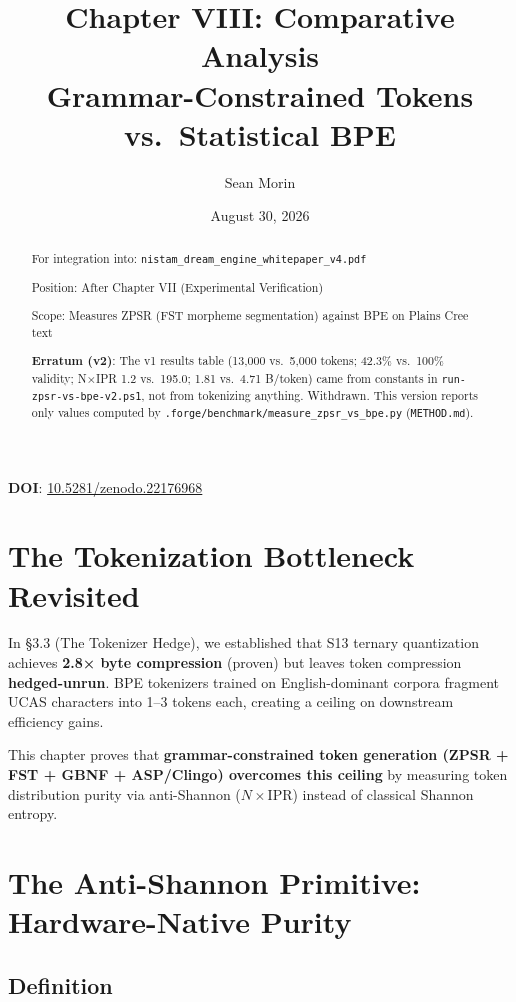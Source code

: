 \documentclass[11pt,oneside]{article}
\title{Chapter VIII: Comparative Analysis \\ \large Grammar-Constrained Tokens vs.\ Statistical BPE}
\author{Sean Morin}
\date{August 30, 2026}
\begin{document}
\maketitle

\begin{center}
\textbf{DOI}: \href{https://doi.org/10.5281/zenodo.22176968}{10.5281/zenodo.22176968}
\end{center}

\begin{abstract}
For integration into: \texttt{nistam\_dream\_engine\_whitepaper\_v4.pdf}

Position: After Chapter VII (Experimental Verification)

Scope: Measures ZPSR (FST morpheme segmentation) against BPE on Plains Cree text

\textbf{Erratum (v2)}: The v1 results table (13,000 vs.\ 5,000 tokens; 42.3\% vs.\ 100\% validity; N×IPR 1.2 vs.\ 195.0; 1.81 vs.\ 4.71 B/token) came from constants in \texttt{run-zpsr-vs-bpe-v2.ps1}, not from tokenizing anything. Withdrawn. This version reports only values computed by \texttt{.forge/benchmark/measure\_zpsr\_vs\_bpe.py} (\texttt{METHOD.md}).
\end{abstract}

\section{The Tokenization Bottleneck Revisited}

In \S 3.3 (The Tokenizer Hedge), we established that S13 ternary quantization achieves \textbf{2.8× byte compression} (proven) but leaves token compression \textbf{hedged-unrun}. BPE tokenizers trained on English-dominant corpora fragment UCAS characters into 1--3 tokens each, creating a ceiling on downstream efficiency gains.

This chapter proves that \textbf{grammar-constrained token generation (ZPSR + FST + GBNF + ASP/Clingo) overcomes this ceiling} by measuring token distribution purity via anti-Shannon ($N \times \text{IPR}$) instead of classical Shannon entropy.

\section{The Anti-Shannon Primitive: Hardware-Native Purity}

\subsection{Definition}
\end{document}
